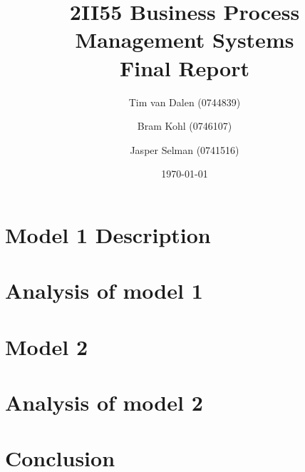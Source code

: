 \documentclass[11pt,a4paper]{article}
\title{
	{\huge 2II55 Business Process Management Systems}\\
	{\large Final Report}
}
\author{
	Tim van Dalen (0744839)
	\and
	Bram Kohl (0746107)
	\and
	Jasper Selman (0741516)
}
\date{\today}
\begin{document}
	\maketitle

	

	\section{Model 1 Description}
	\label{sec:model1}
	

	\section{Analysis of model 1}
	\label{sec:analysis1}
	

	\section{Model 2}
	\label{sec:model2}
	

	\section{Analysis of model 2}
	\label{sec:analysis2}
	

	\section{Conclusion}
	\label{sec:conclusion}
	

	\begin{appendix}
	\newpage
	
	
	

	

	
	\end{appendix}
\end{document}
